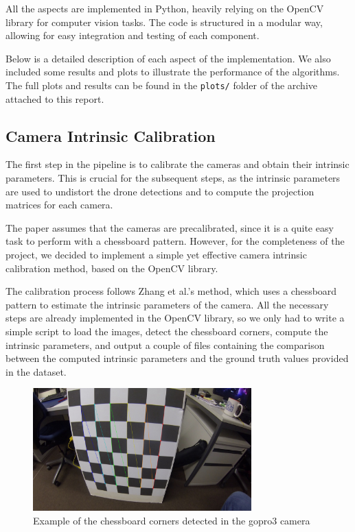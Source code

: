\documentclass[11pt]{article}
\begin{document}
All the aspects are implemented in Python, heavily relying on the OpenCV library for computer vision tasks. The code is structured in a modular way, allowing for easy integration and testing of each component.

Below is a detailed description of each aspect of the implementation. We also included some results and plots to illustrate the performance of the algorithms. The full plots and results can be found in the \texttt{plots/} folder of the archive attached to this report.

\subsection{Camera Intrinsic Calibration}

The first step in the pipeline is to calibrate the cameras and obtain their intrinsic parameters. This is crucial for the subsequent steps, as the intrinsic parameters are used to undistort the drone detections and to compute the projection matrices for each camera.

The paper assumes that the cameras are precalibrated, since it is a quite easy task to perform with a chessboard pattern. However, for the completeness of the project, we decided to implement a simple yet effective camera intrinsic calibration method, based on the OpenCV library.

The calibration process follows Zhang et al.'s method, which uses a chessboard pattern to estimate the intrinsic parameters of the camera. All the necessary steps are already implemented in the OpenCV library, so we only had to write a simple script to load the images, detect the chessboard corners, compute the intrinsic parameters, and output a couple of files containing the comparison between the computed intrinsic parameters and the ground truth values provided in the dataset.

\begin{figure}[H]
    \centering
    \includegraphics[width=0.75\textwidth]{../plots/intrinsic_calibration/gopro3_first_detection.png}
    \caption{Example of the chessboard corners detected in the gopro3 camera}
    \label{fig:chessboard_detection}
\end{figure}
\end{document}
